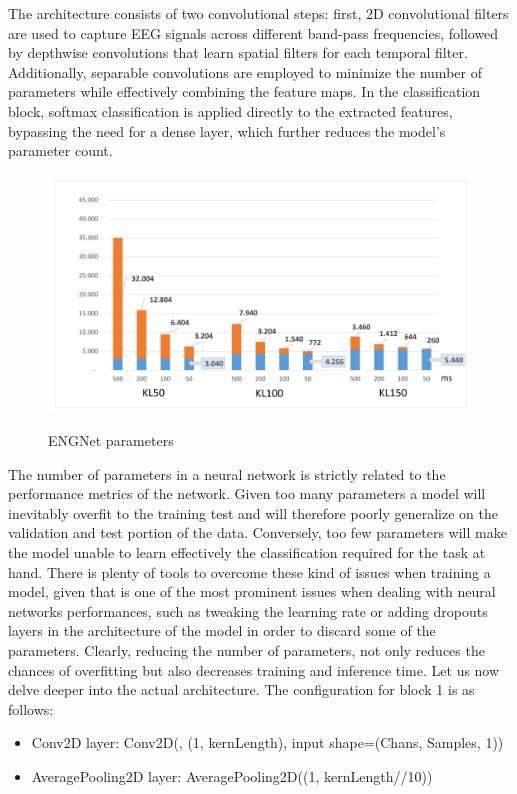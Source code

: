 \documentclass{Configuration_Files/PoliMi3i_thesis}
\begin{document}
The architecture consists of two convolutional steps: first, 2D convolutional filters are used to capture EEG signals across different band-pass frequencies, followed by depthwise convolutions that learn spatial filters for each temporal filter. Additionally, separable convolutions are employed to minimize the number of parameters while effectively combining the feature maps. In the classification block, softmax classification is applied directly to the extracted features, bypassing the need for a dense layer, which further reduces the model's parameter count. \cite{tesiDavide}


\begin{figure}[H]
	\includegraphics[scale=0.3]{engNet_params.png}
	\centering
    \label{engNet_params_1}
    \caption{ENGNet parameters \cite{tesiDavide}}
\end{figure}

The number of parameters in a neural network is strictly related to the performance metrics of the network.
Given too many parameters a model will inevitably overfit to the training test and will therefore poorly generalize on the validation and test portion of the data. Conversely, too few parameters will make the model unable to learn effectively the classification required for the task at hand.
There is plenty of tools to overcome these kind of issues when training a model, given that is one of the most prominent issues when dealing with neural networks performances, such as tweaking the learning rate or adding dropouts layers in the architecture of the model in order to discard some of the parameters.
Clearly, reducing the number of parameters, not only reduces the chances of overfitting but also decreases training and inference time.
Let us now delve deeper into the actual architecture.
The configuration for block 1 is as follows:
\begin{itemize}
\item Conv2D layer: Conv2D(, (1, kernLength), input shape=(Chans, Samples, 1))
\item AveragePooling2D layer: AveragePooling2D((1, kernLength//10))
\end{itemize}
\end{document}
